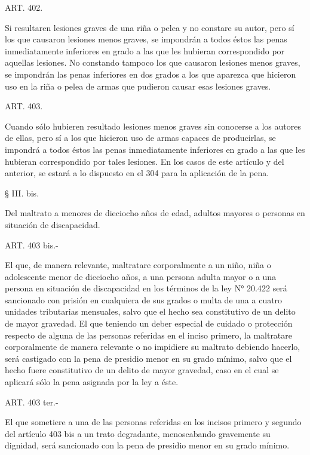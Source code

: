     ART. 402.

    Si resultaren lesiones graves de una riña o pelea y no constare su autor, pero sí los que causaron lesiones menos graves, se impondrán a todos éstos las penas inmediatamente inferiores en grado a las que les hubieran correspondido por aquellas lesiones.
    No constando tampoco los que causaron lesiones menos graves, se impondrán las penas inferiores en dos grados a los que aparezca que hicieron uso en la riña o pelea de armas que pudieron causar esas lesiones graves.


    ART. 403.

    Cuando sólo hubieren resultado lesiones menos graves sin conocerse a los autores de ellas, pero sí a los que hicieron uso de armas capaces de producirlas, se impondrá a todos éstos las penas inmediatamente inferiores en grado a las que les hubieran correspondido por tales lesiones.
    En los casos de este artículo y del anterior, se estará a lo dispuesto en el 304 para la aplicación de la pena.


     
    § III. bis.

    Del maltrato a menores de dieciocho años de edad, adultos mayores o personas en situación de discapacidad.




    ART. 403 bis.-

    El que, de manera relevante, maltratare corporalmente a un niño, niña o adolescente menor de dieciocho años, a una persona adulta mayor o a una persona en situación de discapacidad en los términos de la ley N° 20.422 será sancionado con prisión en cualquiera de sus grados o multa de una a cuatro unidades tributarias mensuales, salvo que el hecho sea constitutivo de un delito de mayor gravedad.
    El que teniendo un deber especial de cuidado o protección respecto de alguna de las personas referidas en el inciso primero, la maltratare corporalmente de manera relevante o no impidiere su maltrato debiendo hacerlo, será castigado con la pena de presidio menor en su grado mínimo, salvo que el hecho fuere constitutivo de un delito de mayor gravedad, caso en el cual se aplicará sólo la pena asignada por la ley a éste.

    ART. 403 ter.-

    El que sometiere a una de las personas referidas en los incisos primero y segundo del artículo 403 bis a un trato degradante, menoscabando gravemente su dignidad, será sancionado con la pena de presidio menor en su grado mínimo.

